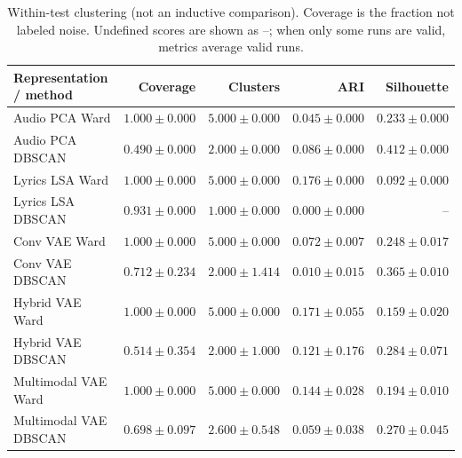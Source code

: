 \begin{table}[htbp]
\centering
\caption{Within-test clustering (not an inductive comparison). Coverage is the fraction not labeled noise. Undefined scores are shown as --; when only some runs are valid, metrics average valid runs.}
\label{tab:transductive}
\small
\begin{tabular}{lrrrr}
\toprule
Representation / method & Coverage & Clusters & ARI & Silhouette \\
\midrule
Audio PCA Ward & $1.000\pm0.000$ & $5.000\pm0.000$ & $0.045\pm0.000$ & $0.233\pm0.000$ \\
Audio PCA DBSCAN & $0.490\pm0.000$ & $2.000\pm0.000$ & $0.086\pm0.000$ & $0.412\pm0.000$ \\
Lyrics LSA Ward & $1.000\pm0.000$ & $5.000\pm0.000$ & $0.176\pm0.000$ & $0.092\pm0.000$ \\
Lyrics LSA DBSCAN & $0.931\pm0.000$ & $1.000\pm0.000$ & $0.000\pm0.000$ & -- \\
Conv VAE Ward & $1.000\pm0.000$ & $5.000\pm0.000$ & $0.072\pm0.007$ & $0.248\pm0.017$ \\
Conv VAE DBSCAN & $0.712\pm0.234$ & $2.000\pm1.414$ & $0.010\pm0.015$ & $0.365\pm0.010$ \\
Hybrid VAE Ward & $1.000\pm0.000$ & $5.000\pm0.000$ & $0.171\pm0.055$ & $0.159\pm0.020$ \\
Hybrid VAE DBSCAN & $0.514\pm0.354$ & $2.000\pm1.000$ & $0.121\pm0.176$ & $0.284\pm0.071$ \\
Multimodal VAE Ward & $1.000\pm0.000$ & $5.000\pm0.000$ & $0.144\pm0.028$ & $0.194\pm0.010$ \\
Multimodal VAE DBSCAN & $0.698\pm0.097$ & $2.600\pm0.548$ & $0.059\pm0.038$ & $0.270\pm0.045$ \\
\bottomrule
\end{tabular}
\end{table}
